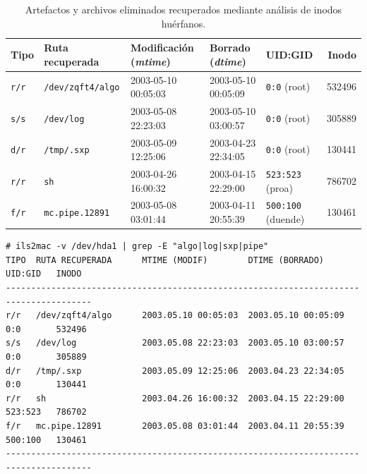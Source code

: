 \begin{table}[htbp]
\centering
\scriptsize
\begin{tabularx}{\textwidth}{@{} l >{\raggedright\arraybackslash}X l l l r @{}}
\toprule
\textbf{Tipo} & \textbf{Ruta recuperada} & \textbf{Modificación (\textit{mtime})} & \textbf{Borrado (\textit{dtime})} & \textbf{UID:GID} & \textbf{Inodo} \\
\midrule
\texttt{r/r} & \texttt{/dev/zqft4/algo}    & 2003-05-10 00:05:03 & 2003-05-10 00:05:09 & \texttt{0:0} (root)      & 532496 \\
\texttt{s/s} & \texttt{/dev/log}           & 2003-05-08 22:23:03 & 2003-05-10 03:00:57 & \texttt{0:0} (root)      & 305889 \\
\texttt{d/r} & \texttt{/tmp/.sxp}          & 2003-05-09 12:25:06 & 2003-04-23 22:34:05 & \texttt{0:0} (root)      & 130441 \\
\texttt{r/r} & \texttt{sh}                 & 2003-04-26 16:00:32 & 2003-04-15 22:29:00 & \texttt{523:523} (proa)  & 786702 \\
\texttt{f/r} & \texttt{mc.pipe.12891}      & 2003-05-08 03:01:44 & 2003-04-11 20:55:39 & \texttt{500:100} (duende)& 130461 \\
\bottomrule
\end{tabularx}
\caption{Artefactos y archivos eliminados recuperados mediante análisis de inodos huérfanos.}
\label{tab:archivos_recuperados}
\end{table}

\noindent
\begin{minipage}{\linewidth}
\begin{lstlisting}[style=terminal]
# ils2mac -v /dev/hda1 | grep -E "algo|log|sxp|pipe"
TIPO  RUTA RECUPERADA      MTIME (MODIF)        DTIME (BORRADO)      UID:GID   INODO
---------------------------------------------------------------------------------------
r/r   /dev/zqft4/algo      2003.05.10 00:05:03  2003.05.10 00:05:09  0:0       532496
s/s   /dev/log             2003.05.08 22:23:03  2003.05.10 03:00:57  0:0       305889
d/r   /tmp/.sxp            2003.05.09 12:25:06  2003.04.23 22:34:05  0:0       130441
r/r   sh                   2003.04.26 16:00:32  2003.04.15 22:29:00  523:523   786702
f/r   mc.pipe.12891        2003.05.08 03:01:44  2003.04.11 20:55:39  500:100   130461
---------------------------------------------------------------------------------------
\end{lstlisting}
\end{minipage}

\vspace{1em}

